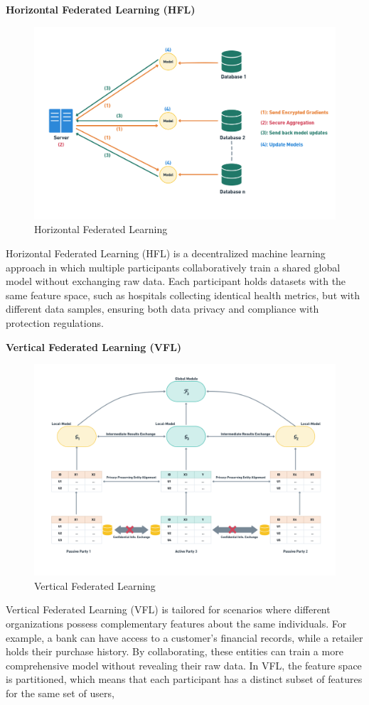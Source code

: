 \textbf{Horizontal Federated Learning (HFL)}
\begin{figure}[H]
    \centering
    \includegraphics[width=0.75\linewidth]{Figures/diagram 1 (2).png}
    \caption{Horizontal Federated Learning}
    \label{fig:enter-label}
\end{figure}

Horizontal Federated Learning (HFL) is a decentralized machine learning approach in which multiple participants collaboratively train a shared global model without exchanging raw data. Each participant holds datasets with the same feature space, such as hospitals collecting identical health metrics, but with different data samples, ensuring both data privacy and compliance with protection regulations.

\textbf{Vertical Federated Learning (VFL)}
\begin{figure}[H]
    \centering
    \includegraphics[width=0.75\linewidth]{Figures/VFL.png}
    \caption{Vertical Federated Learning}
    \label{fig:enter-label}
\end{figure}

Vertical Federated Learning (VFL) is tailored for scenarios where different organizations possess complementary features about the same individuals. For example, a bank can have access to a customer’s financial records, while a retailer holds their purchase history. By collaborating, these entities can train a more comprehensive model without revealing their raw data. In VFL, the feature space is partitioned, which means that each participant has a distinct subset of features for the same set of users,

